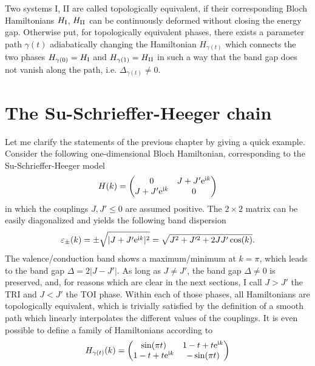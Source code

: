 Two systems I, II are called topologically equivalent, if their corresponding Bloch Hamiltonians $H_{\rm I}$, $H_{\rm II}$ can be continuously deformed without closing the energy gap.
Otherwise put, for topologically equivalent phases, there exists a parameter path $\gamma(t)$ adiabatically changing the Hamiltonian $H_{\gamma(t)}$ which connects the two phases $H_{\gamma(0)}=H_{\rm I}$ and $H_{\gamma(1)}=H_{\rm II}$ in such a way that the band gap does not vanish along the path, i.e. $\Delta_{\gamma(t)}\neq0$.

%
%
\section{The Su-Schrieffer-Heeger chain}
\label{sec:the_SSH_chain}
%
%
Let me clarify the statements of the previous chapter by giving a quick example.
Consider the following one-dimensional Bloch Hamiltonian, corresponding to the Su-Schrieffer-Heeger model
\begin{align}
    H(k)
    =
    \begin{pmatrix}
        0 & J+J'\mathrm e^{\mathrm i k}\\
        J+J'\mathrm e^{\mathrm i k} & 0
    \end{pmatrix}
\end{align}
in which the couplings $J,J'\leq0$ are assumed positive.
The $2\times2$ matrix can be easily diagonalized and yields the following band dispersion
\begin{align}
    \varepsilon_{\pm}(k) = \pm \sqrt{|J+J'\mathrm e^{\mathrm i k}|^2} = \sqrt{J^2+J'^2+2JJ'\cos(k)}.
\end{align}
The valence/conduction band shows a maximum/minimum at $k=\pi$, which leads to the band gap $\Delta = 2\left|J-J'\right|$.
As long as $J\neq J'$, the band gap $\Delta\neq0$ is preserved, and, for reasons which are clear in the next sections, I call $J>J'$ the TRI and $J<J'$ the TOI phase.
Within each of those phases, all Hamiltonians are topologically equivalent, which is trivially satisfied by the definition of a smooth path which linearly interpolates the different values of the couplings.
It is even possible to define a family of Hamiltonians according to
\begin{align}
    H_{\gamma(t)}(k) =
    \begin{pmatrix}
        \sin(\pi t) & 1-t + t\mathrm e^{\mathrm i k} \\
        1-t + t\mathrm e^{\mathrm i k} & -\sin(\pi t)
    \end{pmatrix}
    \label{eq:hamiltonian_path}
\end{align}
